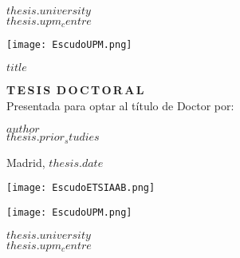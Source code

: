 \begin{center}
\begin{spacing}{1.3}
    \textbf{\large {$thesis.university$}}\\
    \textbf{\large {$thesis.upm_centre$}}\\
    \vspace{5mm}
\end{spacing}
    \texttt{[image: EscudoUPM.png]}

\begin{spacing}{2.0}
\textbf{\LARGE {$title$}}
\end{spacing}

\vspace{15 mm}

\begin{spacing}{1.3}
\textbf{\LARGE {T\,E\,S\,I\,S\, D\,O\,C\,T\,O\,R\,A\,L}}\\
\medskip
{\large {Presentada para optar al título de Doctor por:}}
\end{spacing}
\end{center}


\begin{center}
\begin{spacing}{1.3}
\textbf{\Large {$author$}}\\
{\large {$thesis.prior_studies$}}\\
\end{spacing}
\end{center}

\vspace{\fill}

\begin{center}
    \large {Madrid, $thesis.date$}
\end{center}

\newpage



\begin{minipage}{0.20\textwidth}
        \texttt{[image: EscudoETSIAAB.png]}   
\end{minipage}
\begin{minipage}{0.20\textwidth}
        \texttt{[image: EscudoUPM.png]}
\end{minipage}
\begin{minipage}{0.65\textwidth} \centering
    {$thesis.university$}\\
    {$thesis.upm_centre$}\\
\end{minipage}

